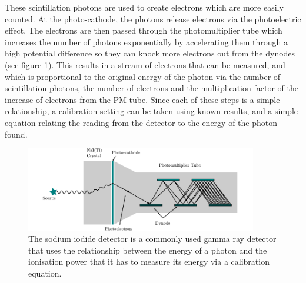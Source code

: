 These scintillation photons are used to create electrons which are more easily counted. At the photo-cathode, the photons release electrons via the photoelectric effect. The electrons are then passed through the photomultiplier tube which increases the number of photons exponentially by accelerating them through a high potential difference so they can knock more electrons out from the dynodes (see figure \ref{fig:naidetctor})\cite{krane}. This results in a stream of electrons that can be measured, and which is proportional to the original energy of the photon via the number of scintillation photons, the number of electrons and the multiplication factor of the increase of electrons from the PM tube. Since each of these steps is a simple relationship, a calibration setting can be taken using known results, and a simple equation relating the reading from the detector to the energy of the photon found.
\begin{figure}[ht]
	\centering
	\includegraphics[width=0.9\textwidth]{NaIdetector.pdf}
	\caption{The sodium iodide detector is a commonly used gamma ray detector that uses the relationship between the energy of a photon and the ionisation power that it has to measure its energy via a calibration equation.\label{fig:naidetctor}}
\end{figure}

